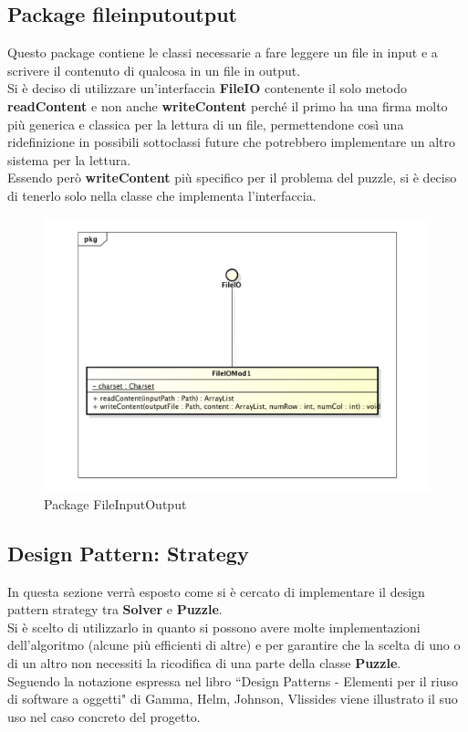 	\subsection{Package fileinputoutput}
Questo package contiene le classi necessarie a fare leggere un file in input e a scrivere il contenuto di qualcosa in un file in output. \\
Si è deciso di utilizzare un'interfaccia \textbf{FileIO} contenente il solo metodo \textbf{readContent} e non anche \textbf{writeContent} perché il primo ha una firma molto più generica e classica per la lettura di un file, permettendone così una ridefinizione in possibili sottoclassi future che potrebbero implementare un altro sistema per la lettura. \\
Essendo però \textbf{writeContent} più specifico per il problema del puzzle, si è deciso di tenerlo solo nella classe che implementa l'interfaccia.

		\begin{figure}[htbp]
			\centering
			\includegraphics[width=15cm]{img/FileInputOutput.pdf}
			\caption{Package FileInputOutput}
			\label{Package FileInputOutput}
		\end{figure}

	
	\subsection{Design Pattern: Strategy} 
	\label{DPS}
In questa sezione verrà esposto come si è cercato di implementare il design pattern strategy tra \textbf{Solver} e \textbf{Puzzle}. \\
Si è scelto di utilizzarlo in quanto si possono avere molte implementazioni dell'algoritmo (alcune più efficienti di altre) e per garantire che la scelta di uno o di un altro non necessiti la ricodifica di una parte della classe \textbf{Puzzle}. \\
Seguendo la notazione espressa nel libro ``Design Patterns - Elementi per il riuso di software a oggetti" di Gamma, Helm, Johnson, Vlissides viene illustrato il suo uso nel caso concreto del progetto. \\

